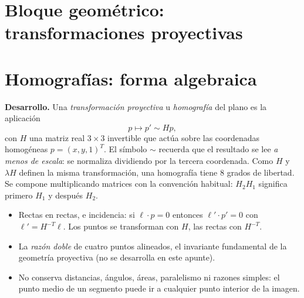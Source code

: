 \section{Bloque geométrico: transformaciones proyectivas}\label{cap:12}\label{sec:bloque-proyectivas}

{\small\vspace{1mm}\par}
{\small\vspace{1mm}\par}


\section{Homografías: forma algebraica}\label{sec:homografias}

\textbf{Desarrollo.} Una \emph{transformación proyectiva} u \emph{homografía} del plano es la
aplicación
\[
  \boxed{p\longmapsto p'\sim Hp},
\]
con \(H\) una matriz real \(3\times3\) invertible que actúa sobre las coordenadas
homogéneas \(p=(x,y,1)^T\). El símbolo \(\sim\) recuerda que el resultado se lee \emph{a menos
de escala}: se normaliza dividiendo por la tercera coordenada. Como \(H\) y \(\lambda H\)
definen la misma transformación, una homografía tiene \(8\) grados de libertad. Se compone
multiplicando matrices con la convención habitual: \(H_2H_1\) significa primero \(H_1\) y
después \(H_2\).

\begin{resultado}
\begin{itemize}
  \item Rectas en rectas, e incidencia: si \(\ell\cdot p=0\) entonces \(\ell'\cdot p'=0\)
  con \(\ell'=H^{-T}\ell\). Los puntos se transforman con \(H\), las rectas con
  \(H^{-T}\).
  \item La \emph{razón doble} de cuatro puntos alineados, el invariante fundamental de la
  geometría proyectiva (no se desarrolla en este apunte).
  \item No conserva distancias, ángulos, áreas, paralelismo ni razones simples: el punto medio
  de un segmento puede ir a cualquier punto interior de la imagen.
\end{itemize}
\end{resultado}

